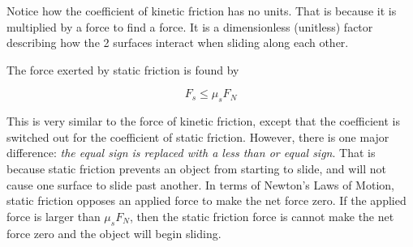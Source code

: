 \documentclass[12pt]{book}
\begin{document}
Notice how the coefficient of kinetic friction has no units. That is because it is multiplied by a force to find a force. It is a dimensionless (unitless) factor describing how the 2 surfaces interact when sliding along each other.

The force exerted by static friction is found by

\begin{equation}
F_s \leq \mu_s F_N
\label{sfriction}
\end{equation}

This is very similar to the force of kinetic friction, except that the coefficient is switched out for the coefficient of static friction. However, there is one major difference: \textit{the equal sign is replaced with a less than or equal sign}. That is because static friction prevents an object from starting to slide, and will not cause one surface to slide past another. In terms of Newton's Laws of Motion, static friction opposes an applied force to make the net force zero. If the applied force is larger than $\mu_s F_N$, then the static friction force is cannot make the net force zero and the object will begin sliding. 
\end{document}
